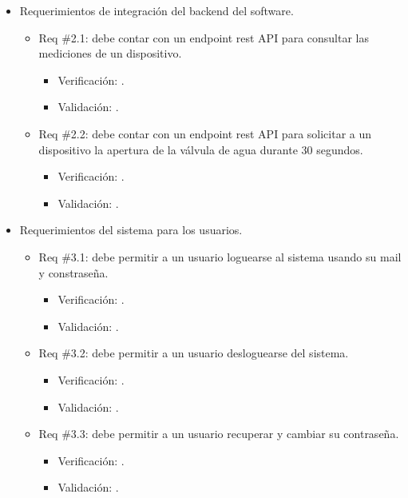 \documentclass[
11pt, %
codirector, %
]{charter}
\begin{document}
\begin{itemize}
\item Requerimientos de integración del backend del software.
	\begin{itemize}
	\item Req \#2.1: debe contar con un endpoint rest API para consultar las mediciones de un dispositivo.
		\begin{itemize}
		\item Verificación: .
		\item Validación: .\\
		\end{itemize}
		
	\item Req \#2.2: debe contar con un endpoint rest API para solicitar a un dispositivo la apertura de la válvula de agua durante 30 segundos.
		\begin{itemize}
		\item Verificación: .
		\item Validación: .\\
		\end{itemize}
		
	\end{itemize}

\item Requerimientos del sistema para los usuarios.
	\begin{itemize}
	\item Req \#3.1: debe permitir a un usuario loguearse al sistema usando su mail y constraseña.
		\begin{itemize}
		\item Verificación: .
		\item Validación: .\\
		\end{itemize}
		
	\item Req \#3.2: debe permitir a un usuario desloguearse del sistema.
		\begin{itemize}
		\item Verificación: .
		\item Validación: .\\
		\end{itemize}
		
	\item Req \#3.3: debe permitir a un usuario recuperar y cambiar su contraseña.
		\begin{itemize}
		\item Verificación: .
		\item Validación: .\\
		\end{itemize}
		

\end{itemize}
\end{itemize}
\end{document}

